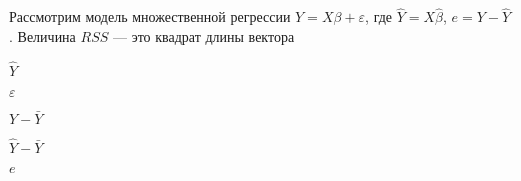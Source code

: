 
\begin{question}
Рассмотрим модель множественной регрессии \(Y=X\beta+\varepsilon\), где
\(\hat Y = X\hat\beta\), \(e=Y-\hat Y\). Величина \(RSS\) --- это
квадрат длины вектора
\begin{answerlist}
  \item \(\hat Y\)
  \item \(\varepsilon\)
  \item \(Y-\bar Y\)
  \item \(\hat Y - \bar Y\)
  \item \(e\)
\end{answerlist}
\end{question}


